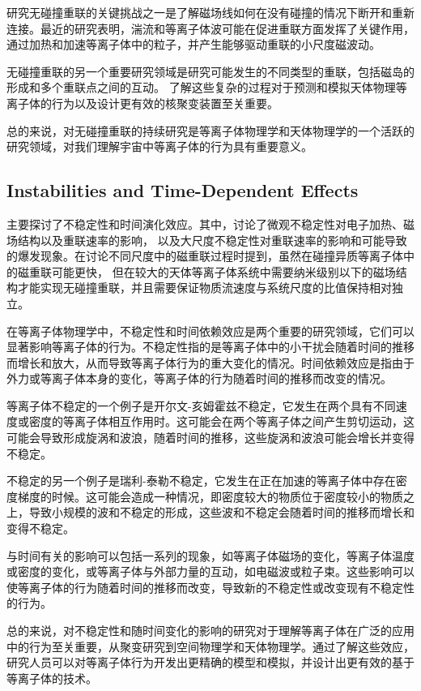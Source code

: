 \documentclass[12pt, a4paper, oneside]{article}
\begin{document}
\begin{spacing}{2.0}
研究无碰撞重联的关键挑战之一是了解磁场线如何在没有碰撞的情况下断开和重新连接。最近的研究表明，湍流和等离子体波可能在促进重联方面发挥了关键作用，
通过加热和加速等离子体中的粒子，并产生能够驱动重联的小尺度磁波动。

无碰撞重联的另一个重要研究领域是研究可能发生的不同类型的重联，包括磁岛的形成和多个重联点之间的互动。
了解这些复杂的过程对于预测和模拟天体物理等离子体的行为以及设计更有效的核聚变装置至关重要。

总的来说，对无碰撞重联的持续研究是等离子体物理学和天体物理学的一个活跃的研究领域，对我们理解宇宙中等离子体的行为具有重要意义。


\subsection{Instabilities and Time-Dependent Effects}
主要探讨了不稳定性和时间演化效应。其中，讨论了微观不稳定性对电子加热、磁场结构以及重联速率的影响，
以及大尺度不稳定性对重联速率的影响和可能导致的爆发现象。在讨论不同尺度中的磁重联过程时提到，虽然在碰撞异质等离子体中的磁重联可能更快，
但在较大的天体等离子体系统中需要纳米级别以下的磁场结构才能实现无碰撞重联，并且需要保证物质流速度与系统尺度的比值保持相对独立。


在等离子体物理学中，不稳定性和时间依赖效应是两个重要的研究领域，它们可以显著影响等离子体的行为。不稳定性指的是等离子体中的小干扰会随着时间的推移而增长和放大，从而导致等离子体行为的重大变化的情况。时间依赖效应是指由于外力或等离子体本身的变化，等离子体的行为随着时间的推移而改变的情况。

等离子体不稳定的一个例子是开尔文-亥姆霍兹不稳定，它发生在两个具有不同速度或密度的等离子体相互作用时。这可能会在两个等离子体之间产生剪切运动，这可能会导致形成旋涡和波浪，随着时间的推移，这些旋涡和波浪可能会增长并变得不稳定。

不稳定的另一个例子是瑞利-泰勒不稳定，它发生在正在加速的等离子体中存在密度梯度的时候。这可能会造成一种情况，即密度较大的物质位于密度较小的物质之上，导致小规模的波和不稳定的形成，这些波和不稳定会随着时间的推移而增长和变得不稳定。

与时间有关的影响可以包括一系列的现象，如等离子体磁场的变化，等离子体温度或密度的变化，或等离子体与外部力量的互动，如电磁波或粒子束。这些影响可以使等离子体的行为随着时间的推移而改变，导致新的不稳定性或改变现有不稳定性的行为。

总的来说，对不稳定性和随时间变化的影响的研究对于理解等离子体在广泛的应用中的行为至关重要，从聚变研究到空间物理学和天体物理学。通过了解这些效应，研究人员可以对等离子体行为开发出更精确的模型和模拟，并设计出更有效的基于等离子体的技术。


\end{spacing}
\end{document}

